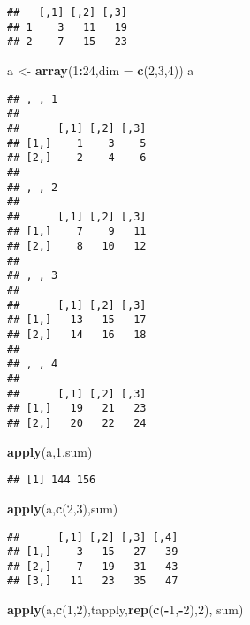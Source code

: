 \documentclass[]{ctexbook}
\newenvironment{Shaded}{\begin{snugshade}}{\end{snugshade}}
\newcommand{\DataTypeTok}[1]{\textcolor[rgb]{0.13,0.29,0.53}{#1}}
\newcommand{\DecValTok}[1]{\textcolor[rgb]{0.00,0.00,0.81}{#1}}
\newcommand{\KeywordTok}[1]{\textcolor[rgb]{0.13,0.29,0.53}{\textbf{#1}}}
\newcommand{\NormalTok}[1]{#1}
\newcommand{\OperatorTok}[1]{\textcolor[rgb]{0.81,0.36,0.00}{\textbf{#1}}}
\newcommand{\StringTok}[1]{\textcolor[rgb]{0.31,0.60,0.02}{#1}}
\begin{document}
\begin{verbatim}
##   [,1] [,2] [,3]
## 1    3   11   19
## 2    7   15   23
\end{verbatim}

\begin{Shaded}
\begin{Highlighting}[]
\NormalTok{a <-}\StringTok{ }\KeywordTok{array}\NormalTok{(}\DecValTok{1}\OperatorTok{:}\DecValTok{24}\NormalTok{,}\DataTypeTok{dim =} \KeywordTok{c}\NormalTok{(}\DecValTok{2}\NormalTok{,}\DecValTok{3}\NormalTok{,}\DecValTok{4}\NormalTok{))}
\NormalTok{a}
\end{Highlighting}
\end{Shaded}

\begin{verbatim}
## , , 1
## 
##      [,1] [,2] [,3]
## [1,]    1    3    5
## [2,]    2    4    6
## 
## , , 2
## 
##      [,1] [,2] [,3]
## [1,]    7    9   11
## [2,]    8   10   12
## 
## , , 3
## 
##      [,1] [,2] [,3]
## [1,]   13   15   17
## [2,]   14   16   18
## 
## , , 4
## 
##      [,1] [,2] [,3]
## [1,]   19   21   23
## [2,]   20   22   24
\end{verbatim}

\begin{Shaded}
\begin{Highlighting}[]
\KeywordTok{apply}\NormalTok{(a,}\DecValTok{1}\NormalTok{,sum)}
\end{Highlighting}
\end{Shaded}

\begin{verbatim}
## [1] 144 156
\end{verbatim}

\begin{Shaded}
\begin{Highlighting}[]
\KeywordTok{apply}\NormalTok{(a,}\KeywordTok{c}\NormalTok{(}\DecValTok{2}\NormalTok{,}\DecValTok{3}\NormalTok{),sum)}
\end{Highlighting}
\end{Shaded}

\begin{verbatim}
##      [,1] [,2] [,3] [,4]
## [1,]    3   15   27   39
## [2,]    7   19   31   43
## [3,]   11   23   35   47
\end{verbatim}

\begin{Shaded}
\begin{Highlighting}[]
\KeywordTok{apply}\NormalTok{(a,}\KeywordTok{c}\NormalTok{(}\DecValTok{1}\NormalTok{,}\DecValTok{2}\NormalTok{),tapply,}\KeywordTok{rep}\NormalTok{(}\KeywordTok{c}\NormalTok{(}\OperatorTok{-}\DecValTok{1}\NormalTok{,}\OperatorTok{-}\DecValTok{2}\NormalTok{),}\DecValTok{2}\NormalTok{), sum)}
\end{Highlighting}
\end{Shaded}
\end{document}
